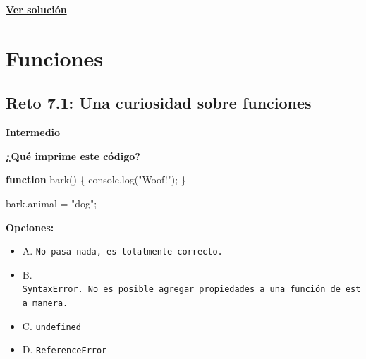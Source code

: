 \documentclass[
  letterpaper,
  DIV=11,
  numbers=noendperiod]{scrreprt}
\newenvironment{Shaded}{\begin{snugshade}}{\end{snugshade}}
\newcommand{\AttributeTok}[1]{\textcolor[rgb]{0.40,0.45,0.13}{#1}}
\newcommand{\BuiltInTok}[1]{\textcolor[rgb]{0.00,0.23,0.31}{#1}}
\newcommand{\FunctionTok}[1]{\textcolor[rgb]{0.28,0.35,0.67}{#1}}
\newcommand{\KeywordTok}[1]{\textcolor[rgb]{0.00,0.23,0.31}{\textbf{#1}}}
\newcommand{\NormalTok}[1]{\textcolor[rgb]{0.00,0.23,0.31}{#1}}
\newcommand{\OperatorTok}[1]{\textcolor[rgb]{0.37,0.37,0.37}{#1}}
\newcommand{\StringTok}[1]{\textcolor[rgb]{0.13,0.47,0.30}{#1}}
\providecommand{\tightlist}{%
  \setlength{\itemsep}{0pt}\setlength{\parskip}{0pt}}
\begin{document}
\textbf{\hyperref[sec-sol-cap6-reto22]{Ver solución}}

\chapter{Funciones}\label{funciones}

\section{Reto 7.1: Una curiosidad sobre funciones}\label{sec-cap7-reto1}

\begin{tcolorbox}[enhanced jigsaw, left=2mm, toprule=.15mm, leftrule=.75mm, breakable, colback=white, coltitle=black, bottomtitle=1mm, arc=.35mm, rightrule=.15mm, colframe=quarto-callout-caution-color-frame, opacitybacktitle=0.6, toptitle=1mm, opacityback=0, titlerule=0mm, title=\textcolor{quarto-callout-caution-color}{\faFire}\hspace{0.5em}{Dificultad}, bottomrule=.15mm, colbacktitle=quarto-callout-caution-color!10!white]

\textbf{Intermedio}

\end{tcolorbox}

\textbf{¿Qué imprime este código?}

\begin{Shaded}
\begin{Highlighting}[]
\KeywordTok{function} \FunctionTok{bark}\NormalTok{() \{}
  \BuiltInTok{console}\OperatorTok{.}\FunctionTok{log}\NormalTok{(}\StringTok{"Woof!"}\NormalTok{)}\OperatorTok{;}
\NormalTok{\}}

\NormalTok{bark}\OperatorTok{.}\AttributeTok{animal} \OperatorTok{=} \StringTok{"dog"}\OperatorTok{;}
\end{Highlighting}
\end{Shaded}

\textbf{Opciones:}

\begin{itemize}
\tightlist
\item
  A. \texttt{No\ pasa\ nada,\ es\ totalmente\ correcto.}
\item
  B.
  \texttt{SyntaxError.\ No\ es\ posible\ agregar\ propiedades\ a\ una\ función\ de\ esta\ manera.}
\item
  C. \texttt{undefined}
\item
  D. \texttt{ReferenceError}
\end{itemize}
\end{document}
